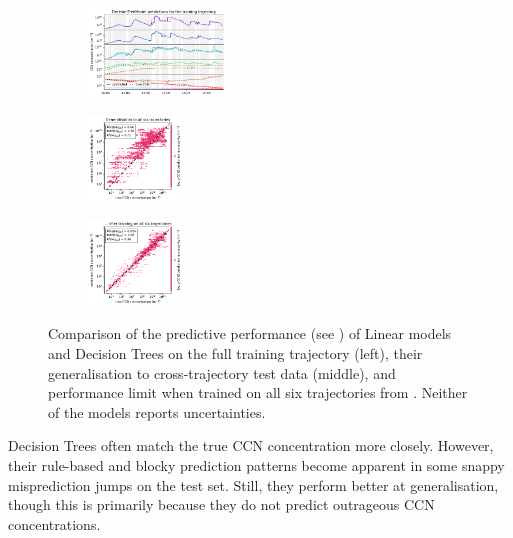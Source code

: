 \begin{figure}[H]
    \begin{subfigure}
    \centering
    \includegraphics[width=0.4\textwidth]{prediction/figures/models/decisiontreemodel-training-prediction.pdf}
    \end{subfigure}
    \begin{subfigure}
    \centering
    \includegraphics[width=0.275\textwidth]{prediction/figures/models/decisiontreemodel-test-generalisation.pdf}
    \end{subfigure}
    \begin{subfigure}
    \centering
    \includegraphics[width=0.275\textwidth]{prediction/figures/models/decisiontreemodel-test-prediction.pdf}
    \end{subfigure}
   
    \vspace{-1em}
    \caption[Predictive Performance of Linear models and Decision Trees]{Comparison of the predictive performance (see ) of Linear models and Decision Trees on the full training trajectory (left), their generalisation to cross-trajectory test data (middle), and performance limit when trained on all six trajectories from . Neither of the models reports uncertainties.}
    \label{fig:linear-tree-models}
\end{figure}

\noindent Decision Trees often match the true CCN concentration more closely. However, their rule-based and blocky prediction patterns become apparent in some snappy misprediction jumps on the test set. Still, they perform better at generalisation, though this is primarily because they do not predict outrageous CCN concentrations.

